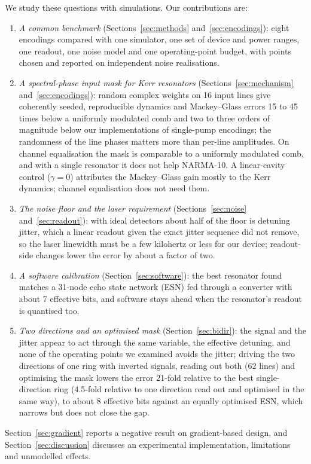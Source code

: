 We study these questions with simulations. Our contributions are:
\begin{enumerate}
\item \emph{A common benchmark} (Sections~\ref{sec:methods} and~\ref{sec:encodings}): eight encodings compared with one simulator,
      one set of device and power ranges, one readout, one noise model and one operating-point budget, with points chosen and
      reported on independent noise realisations.
\item \emph{A spectral-phase input mask for Kerr resonators} (Sections~\ref{sec:mechanism} and~\ref{sec:encodings}): random complex
      weights on 16 input lines give coherently seeded, reproducible dynamics and Mackey--Glass errors 15 to 45 times below a
      uniformly modulated comb and two to three orders of magnitude below our implementations of single-pump encodings; the randomness of the line phases matters more than per-line
      amplitudes. On channel equalisation the mask is comparable to a uniformly modulated comb, and with a single resonator it does
      not help NARMA-10. A linear-cavity control ($\gamma=0$) attributes the Mackey--Glass gain mostly to the Kerr dynamics;
      channel equalisation does not need them.
\item \emph{The noise floor and the laser requirement} (Sections~\ref{sec:noise} and~\ref{sec:readout}): with ideal detectors about
      half of the floor is detuning jitter, which a linear readout given the exact jitter sequence did not remove, so the laser
      linewidth must be a few kilohertz or less for our device; readout-side changes lower the error by about a factor of two.
\item \emph{A software calibration} (Section~\ref{sec:software}): the best resonator found matches a 31-node echo state network (ESN)
      fed through a converter with about 7 effective bits, and software stays ahead when the resonator's readout is quantised too.
\item \emph{Two directions and an optimised mask} (Section~\ref{sec:bidir}): the signal and the jitter appear to act through the
      same variable, the effective detuning, and none of the operating points we examined avoids the jitter; driving the two
      directions of one ring with inverted signals, reading out both (62 lines) and optimising the mask lowers the error 21-fold
      relative to the best single-direction ring (4.5-fold relative to one direction read out and optimised in the same way), to
      about 8 effective bits against an equally optimised ESN, which narrows but does not close the gap.
\end{enumerate}
Section~\ref{sec:gradient} reports a negative result on gradient-based design, and Section~\ref{sec:discussion} discusses an
experimental implementation, limitations and unmodelled effects.
